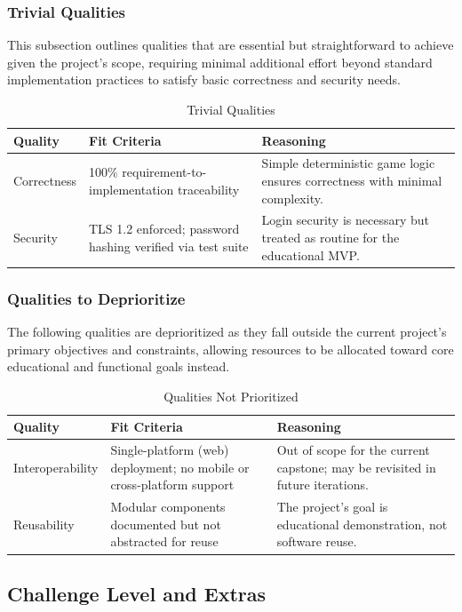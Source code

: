\documentclass[12pt, titlepage]{article}
\begin{document}
\subsubsection{Trivial Qualities}
This subsection outlines qualities that are essential but straightforward to achieve given the project's scope, requiring minimal additional effort beyond standard implementation practices to satisfy basic correctness and security needs.
\begin{table}[H]
\centering
\caption{Trivial Qualities}
\begin{tabularx}{\textwidth}{p{3cm}p{4.5cm}X}
\toprule
\textbf{Quality} & \textbf{Fit Criteria} & \textbf{Reasoning} \\
\midrule
Correctness & 100\% requirement-to-implementation traceability & Simple deterministic game logic ensures correctness with minimal complexity. \\
Security & TLS 1.2 enforced; password hashing verified via test suite & Login security is necessary but treated as routine for the educational MVP. \\
\bottomrule
\end{tabularx}
\end{table}

\subsubsection{Qualities to Deprioritize}
The following qualities are deprioritized as they fall outside the current project's primary objectives and constraints, allowing resources to be allocated toward core educational and functional goals instead.
\begin{table}[H]
\centering
\caption{Qualities Not Prioritized}
\begin{tabularx}{\textwidth}{p{3cm}p{4.5cm}X}
\toprule
\textbf{Quality} & \textbf{Fit Criteria} & \textbf{Reasoning} \\
\midrule
Interoperability & Single-platform (web) deployment; no mobile or cross-platform support & Out of scope for the current capstone; may be revisited in future iterations. \\
Reusability & Modular components documented but not abstracted for reuse & The project’s goal is educational demonstration, not software reuse. \\
\bottomrule
\end{tabularx}
\end{table}

\subsection{Challenge Level and Extras}
\end{document}
